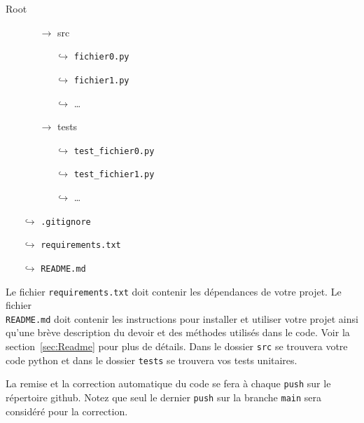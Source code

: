\documentclass[12pt, letterpaper]{article}
\numberwithin{table}{section}
\numberwithin{figure}{section}
\numberwithin{equation}{section}
\begin{document}
Root
\begin{itemize}
    \item[]
        \begin{itemize}
            \item[$\rightarrow$] src
                \begin{itemize}
                    \item[$\hookrightarrow$] \texttt{fichier0.py}
                    \item[$\hookrightarrow$] \texttt{fichier1.py}
                    \item[$\hookrightarrow$] \dots
              \end{itemize}
        \end{itemize}
  \item[]
  \begin{itemize}
    \item[$\rightarrow$] tests
    \begin{itemize}
      \item[$\hookrightarrow$] \texttt{test\_fichier0.py}
      \item[$\hookrightarrow$] \texttt{test\_fichier1.py}
      \item[$\hookrightarrow$] \dots
    \end{itemize}
  \end{itemize}
  \item[$\hookrightarrow$] \texttt{.gitignore}
  \item[$\hookrightarrow$] \texttt{requirements.txt}
  \item[$\hookrightarrow$] \texttt{README.md}
\end{itemize}

\bigskip

\noindent Le fichier \texttt{requirements.txt} doit contenir les dépendances de votre projet.
Le fichier \\\texttt{README.md} doit contenir les instructions pour installer et utiliser votre projet ainsi
qu'une brève description du devoir et des méthodes utilisés dans le code.
Voir la section~\ref{sec:Readme} pour plus de détails.
Dans le dossier \texttt{src} se trouvera votre code python et dans le dossier \texttt{tests} se trouvera vos tests
unitaires.

\bigskip

\noindent La remise et la correction automatique du code se fera à chaque \texttt{push} sur le répertoire github.
Notez que seul le dernier \texttt{push} sur la branche \texttt{main} sera considéré pour la correction.
\end{document}
